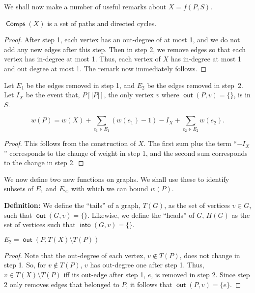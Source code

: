 \documentclass{article}
\DeclareMathOperator{\out}{\bm{\mathsf{out}}}
\DeclareMathOperator{\into}{\bm{\mathsf{into}}}
\DeclareMathOperator{\Comp}{\bm{\mathsf{Comps}}}
\newcommand{\dc}[1]{}%
\begin{document}
\vspace{1.75em}

We shall now make a number of useful remarks about $X=f(P,S)$\dc{, which will allow us to ...}.

\vspace{1.75em}

\begin{rmk} \label{degree rule} $\Comp(X)$ is a set of paths and directed cycles.
\begin{proof}
After step 1, each vertex has an out-degree of at most 1, and we do not add any new edges after this step. Then in step 2, we remove edges so that each vertex has in-degree at most 1. Thus, each vertex of $X$ has in-degree at most 1 and out degree at most 1. The remark now immediately follows.
\end{proof}
\end{rmk}

\vspace{1.75em}

Let $E_1$ be the edges removed in step 1, and $E_2$ be the edges removed in step~2. Let $I_X$ be the event that, $P[|P|]$, the only vertex $v$ where $\out(P,v) = \{\}$, is in $S$.

\begin{rmk}\label{eqq}

\[w(P) = w(X) + \sum_{e_1 \in E_1} (w(e_1)-1)-I_X + \sum_{e_2 \in E_2} w(e_2).\]

\begin{proof}
This follows from the construction of $X$. The first sum plus the term ``$-I_X$'' corresponds to the change of weight in step 1, and the second sum corresponds to the change in step 2.
\end{proof}

\end{rmk}


\vspace{1.75em}

We now define two new functions on graphs. We shall use these to identify subsets of $E_1$ and $E_2$, with which we can bound $w(P)$. 

\textbf{Definition:}\dc{amsthm} We define the ``tails'' of a graph, $T(G)$, as the set of vertices $v \in G$, such that $\out(G,v) = \{\}$. Likewise, we define the ``heads'' of $G$, $H(G)$ as the set of vertices such that $\into(G,v) = \{\}$.

\begin{rmk}\label{e2} $E_2 = \out(P,T(X)\setminus T(P))$
\begin{proof}
Note that the out-degree of each vertex, $v\not\in T(P)$, does not change in step 1. So, for $v \not \in T(P)$, $v$ has out-degree one after step 1. Thus, $v \in T(X)\setminus T(P)$ iff its out-edge after step 1, $e$, is removed in step 2. Since step 2 only removes edges that belonged to $P$, it follows that $\out(P,v) = \{e\}$.
\end{proof}


\end{rmk}
\end{document}
